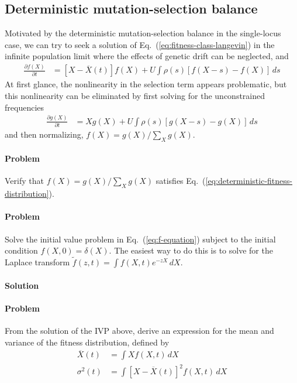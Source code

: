 \documentclass[11pt]{article}
\newcommand{\eq}[1]{Eq.~(\ref{#1})}
\begin{document}
\subsection*{Deterministic mutation-selection balance}

Motivated by the deterministic mutation-selection balance in the single-locus case, we can try to seek a solution of \eq{eq:fitness-class-langevin} in the infinite population limit where the effects of genetic drift can be neglected, and 
\begin{align}
\label{eq:deterministic-fitness-distribution}
\frac{\partial f(X)}{\partial t} & = \left[ X-\overline{X}(t) \right] f(X) + U \int \rho(s) \left[ f(X-s) - f(X) \right] \, ds 
\end{align}
At first glance, the nonlinearity in the selection term appears problematic, but this nonlinearity can be eliminated by first solving for the unconstrained frequencies
\begin{align}
\label{eq:deterministic-fitness-distribution}
\frac{\partial g(X)}{\partial t} & = X g(X) + U \int \rho(s) \left[ g(X-s) - g(X) \right] \, ds 
\end{align}
and then normalizing, $f(X) = g(X) / \sum_X g(X)$. 

\paragraph{Problem} Verify that $f(X) = g(X) / \sum_X g(X)$ satisfies \eq{eq:deterministic-fitness-distribution}. 

\paragraph{Problem} Solve the initial value problem in \eq{eq:f-equation} subject to the initial condition $f(X,0) = \delta(X)$. The easiest way to do this is to solve for the Laplace transform $\tilde{f}(z,t) = \int f(X,t) e^{-z X} \, dX$. 

\paragraph{Solution}

\paragraph{Problem} From the solution of the IVP above, derive an expression for the mean and variance of the fitness distribution, defined by
\begin{align}
\overline{X}(t) & = \int X f(X,t) \, dX \\
\sigma^2(t) & = \int \left[ X-\overline{X}(t) \right]^2  f(X,t) \, dX
\end{align}
\end{document}
